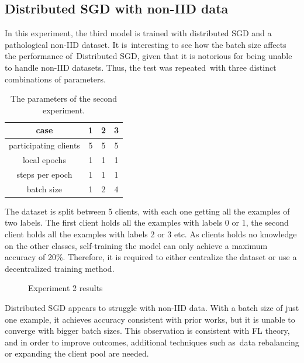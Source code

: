 \subsection{Distributed SGD with non-IID data}
In this experiment, the third model is trained with distributed SGD and a pathological non-IID dataset. It is interesting to see how the batch size affects the performance of Distributed SGD, given that it is notorious for being unable to handle non-IID datasets. Thus, the test was repeated with three distinct combinations of parameters.

\begin{table}[H]
    \center
    \begin{tabular}{ | c | c | c | c | }
        \hline
        case & 1 & 2 & 3\\
        \hline\hline
        participating clients & 5 & 5 & 5 \\
        \hline
        local epochs & 1 & 1 & 1 \\
        \hline
        steps per epoch & 1 & 1 & 1 \\
        \hline
        batch size & 1 & 2 & 4 \\
        \hline
    \end{tabular}
    \caption[Experiment 2 Parameters]{The parameters of the second experiment.}
    \label{table:Experiment 2 parameters}
\end{table}

The dataset is split between 5 clients, with each one getting all the examples of two labels. The first client holds all the examples with labels 0 or 1, the second client holds all the examples with labels 2 or 3 etc. As clients holds no knowledge on the other classes, self-training the model can only achieve a maximum accuracy of 20\%. Therefore, it is required to either centralize the dataset or use a decentralized training method.

\begin{figure}[H]
    \center
    
    \caption[Experiment 2 results]{Experiment 2 results}
    \label{fig:Experiment 2 results}
\end{figure}

Distributed SGD appears to struggle with non-IID data. With a batch size of just one example, it achieves accuracy consistent with prior works\cite{FL-original-paper}, but it is unable to converge with bigger batch sizes. This observation is consistent with FL theory, and in order to improve outcomes, additional techniques such as data rebalancing or expanding the client pool are needed.

